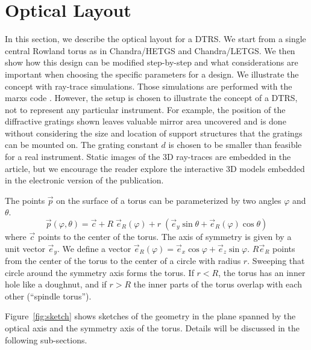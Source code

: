 \documentclass[linenumbers]{aastex631}
\begin{document}
\section{Optical Layout}
\label{sect:opticallayout}
In this section, we describe the optical layout for a DTRS. We start from a single central Rowland torus as in Chandra/HETGS and Chandra/LETGS. We then show how this design can be modified step-by-step and what considerations are important when choosing the specific parameters for a design. We illustrate the concept with ray-trace simulations. Those simulations are performed with the marxs code \citep{2017AJ....154..243G}. However, the setup is chosen to illustrate the concept of a DTRS, not to represent any particular instrument. For example, the position of the diffractive gratings shown leaves valuable mirror area uncovered and is done without considering the size and location of support structures that the gratings can be mounted on. The grating constant $d$ is chosen to be smaller than feasible for a real instrument. Static images of the 3D ray-traces are embedded in the article, but we encourage the reader explore the interactive 3D models embedded in the electronic version of the publication.

The points $\vec p$ on the surface of a torus can be parameterized by two angles $\varphi$ and $\theta$.
\begin{equation}
\vec p(\varphi, \theta) = \vec c + R \; \vec e_R(\varphi) + r \; (\vec e_y \sin \theta + \vec e_R(\varphi) \cos \theta)
\end{equation}
where $\vec c$ points to the center of the torus. The axis of symmetry is given by a unit vector $\vec e_y$. We define a vector $\vec e_R(\varphi) = \vec e_x \cos\varphi + \vec e_z \sin\varphi$. $R \vec e_R$ points from the center of the torus to the center of a circle with radius $r$. Sweeping that circle around the symmetry axis forms the torus. If $r < R$, the torus has an inner hole like a doughnut, and if $r > R$ the inner parts of the torus overlap with each other (``spindle torus'').

Figure~\ref{fig:sketch} shows sketches of the geometry in the plane spanned by the optical axis and the symmetry axis of the torus. Details will be discussed in the following sub-sections.
\end{document}
